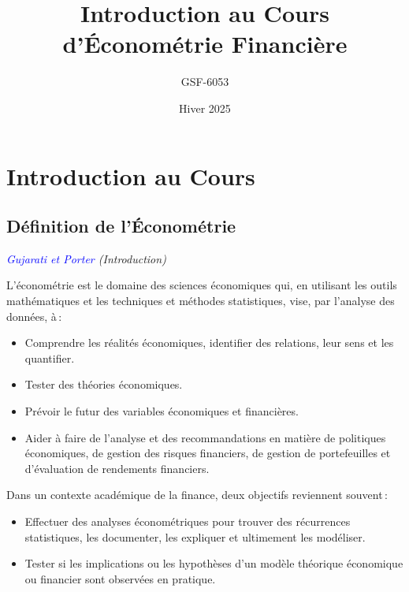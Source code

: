 \documentclass[14pt]{extarticle} %
\title{\Huge Introduction au Cours d'Économétrie Financière}
\author{GSF-6053}
\date{Hiver 2025}
\newcommand{\livre}[1]{\textcolor{blue}{#1}}
\begin{document}
\maketitle
\tableofcontents
\newpage

\onehalfspacing

\section{Introduction au Cours}

\subsection{Définition de l’Économétrie}

\textit{\livre{Gujarati et Porter} (Introduction)}

L’économétrie est le domaine des sciences économiques qui, en utilisant les outils mathématiques et les techniques et méthodes statistiques, vise, par l’analyse des données, à :

\begin{itemize}
    \item Comprendre les réalités économiques, identifier des relations, leur sens et les quantifier.
    \item Tester des théories économiques.
    \item Prévoir le futur des variables économiques et financières.
    \item Aider à faire de l’analyse et des recommandations en matière de politiques économiques, de gestion des risques financiers, de gestion de portefeuilles et d’évaluation de rendements financiers.
\end{itemize}

Dans un contexte académique de la finance, deux objectifs reviennent souvent :

\begin{itemize}
    \item Effectuer des analyses économétriques pour trouver des récurrences statistiques, les documenter, les expliquer et ultimement les modéliser.
    \item Tester si les implications ou les hypothèses d’un modèle théorique économique ou financier sont observées en pratique.
\end{itemize}
\end{document}
